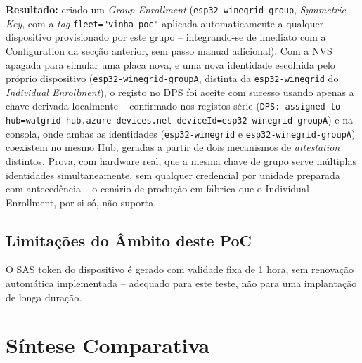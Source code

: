 \documentclass[a4paper,12pt]{article}
\begin{document}
\textbf{Resultado:} criado um \textit{Group Enrollment} (\texttt{esp32-winegrid-group}, \textit{Symmetric Key}, com a \textit{tag} \texttt{fleet="vinha-poc"} aplicada automaticamente a qualquer dispositivo provisionado por este grupo -- integrando-se de imediato com a Configuration da secção anterior, sem passo manual adicional). Com a NVS apagada para simular uma placa nova, e uma nova identidade escolhida pelo próprio dispositivo (\texttt{esp32-winegrid-groupA}, distinta da \texttt{esp32-winegrid} do \textit{Individual Enrollment}), o registo no DPS foi aceite com sucesso usando apenas a chave derivada localmente -- confirmado nos registos série (\texttt{DPS: assigned to hub=watgrid-hub.azure-devices.net deviceId=esp32-winegrid-groupA}) e na consola, onde ambas as identidades (\texttt{esp32-winegrid} e \texttt{esp32-winegrid-groupA}) coexistem no mesmo Hub, geradas a partir de dois mecanismos de \textit{attestation} distintos. Prova, com hardware real, que a mesma chave de grupo serve múltiplas identidades simultaneamente, sem qualquer credencial por unidade preparada com antecedência -- o cenário de produção em fábrica que o Individual Enrollment, por si só, não suporta.

\subsection{Limitações do Âmbito deste PoC}
O SAS token do dispositivo é gerado com validade fixa de 1 hora, sem renovação automática implementada -- adequado para este teste, não para uma implantação de longa duração.

\section{Síntese Comparativa}
\end{document}
